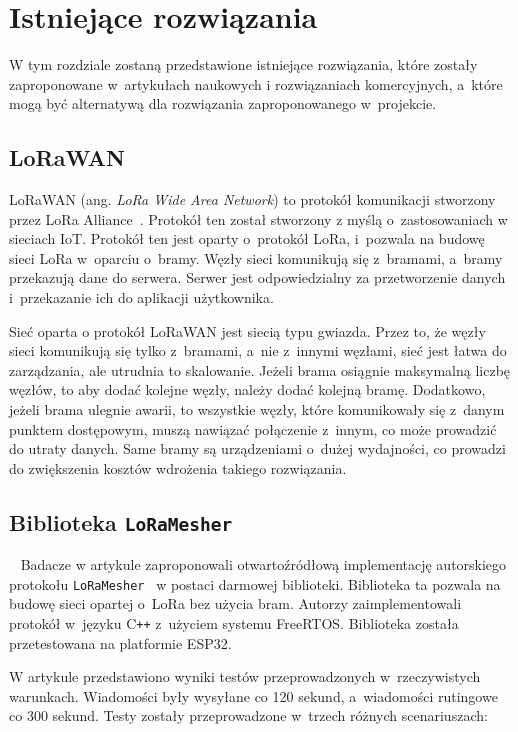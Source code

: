 \chapter{Istniejące rozwiązania}
W tym rozdziale zostaną przedstawione istniejące rozwiązania, które zostały zaproponowane w~artykułach naukowych i rozwiązaniach komercyjnych, a~które mogą być alternatywą dla rozwiązania zaproponowanego w~projekcie.
\section{LoRaWAN}

LoRaWAN (ang. \emph{LoRa Wide Area Network}) to protokół komunikacji stworzony przez LoRa Alliance~\cite{lora:about}.
Protokół ten został stworzony z myślą o~zastosowaniach w sieciach IoT.
Protokół ten jest oparty o~protokół LoRa, i~pozwala na budowę sieci LoRa w~oparciu o~bramy.
Węzły sieci komunikują się z~bramami, a~bramy przekazują dane do serwera.
Serwer jest odpowiedzialny za przetworzenie danych i~przekazanie ich do aplikacji użytkownika.

Sieć oparta o protokół LoRaWAN jest siecią typu gwiazda. Przez to, że węzły sieci komunikują się tylko z~bramami, a~nie z~innymi węzłami, sieć jest łatwa do zarządzania, ale utrudnia to skalowanie. Jeżeli brama osiągnie maksymalną liczbę węzłów, to aby dodać kolejne węzły, należy dodać kolejną bramę. Dodatkowo, jeżeli brama ulegnie awarii, to wszystkie węzły, które komunikowały się z~danym punktem dostępowym, muszą nawiązać połączenie z~innym, co może prowadzić do utraty danych. Same bramy są urządzeniami o~dużej wydajności, co prowadzi do zwiększenia kosztów wdrożenia takiego rozwiązania.


\section{Biblioteka \texttt{LoRaMesher}}~\label{sec:loramesher}
Badacze w artykule zaproponowali otwartoźródłową implementację autorskiego protokołu \texttt{LoRaMesher}~\cite{bib:loramesher} w postaci darmowej biblioteki.
Biblioteka ta pozwala na budowę sieci opartej o~LoRa bez użycia bram.
Autorzy zaimplementowali protokół w~języku C\texttt{++} z~użyciem systemu FreeRTOS.
Biblioteka została przetestowana na platformie ESP32.

W artykule przedstawiono wyniki testów przeprowadzonych w~rzeczywistych warunkach.
Wiadomości były wysyłane co 120 sekund, a~wiadomości rutingowe co 300 sekund.
Testy zostały przeprowadzone w~trzech różnych scenariuszach:

